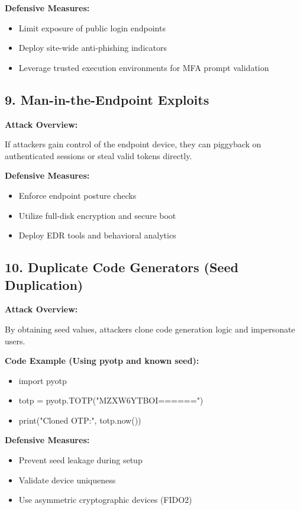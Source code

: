 \textbf{Defensive Measures:}

\begin{itemize}
    \item Limit exposure of public login endpoints
    \item Deploy site-wide anti-phishing indicators
    \item Leverage trusted execution environments for MFA prompt validation

\end{itemize}

\subsection{\textbf{9. Man-in-the-Endpoint Exploits}}

\textbf{Attack Overview:}

If attackers gain control of the endpoint device, they can piggyback on authenticated sessions or steal valid tokens directly.

\textbf{Defensive Measures:}

\begin{itemize}
    \item Enforce endpoint posture checks
    \item Utilize full-disk encryption and secure boot
    \item Deploy EDR tools and behavioral analytics

\end{itemize}

\subsection{\textbf{10. Duplicate Code Generators (Seed Duplication)}}

\textbf{Attack Overview:}

By obtaining seed values, attackers clone code generation logic and impersonate users.

\textbf{Code Example (Using pyotp and known seed):}

\begin{itemize}
    \item import pyotp
    \item totp = pyotp.TOTP("MZXW6YTBOI======")
    \item print("Cloned OTP:", totp.now())
\end{itemize}

\textbf{Defensive Measures:}

\begin{itemize}
    \item Prevent seed leakage during setup
    \item Validate device uniqueness
    \item Use asymmetric cryptographic devices (FIDO2)

\end{itemize}

